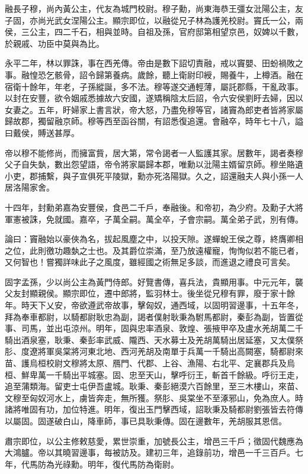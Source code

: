 \begin{pinyinscope}
融長子穆，尚內黃公主，代友為城門校尉。穆子勳，尚東海恭王彊女沘陽公主，友子固，亦尚光武女涅陽公主。顯宗即位，以融從兄子林為護羌校尉。竇氏一公，兩侯，三公主，四二千石，相與並時。自祖及孫，官府邸第相望京邑，奴婢以千數，於親戚、功臣中莫與為比。

永平二年，林以罪誅，事在西羌傳。帝由是數下詔切責融，戒以竇嬰、田蚡禍敗之事。融惶恐乞骸骨，詔令歸第養病。歲餘，聽上衛尉印綬，賜養牛，上樽酒。融在宿衛十餘年，年老，子孫縱誕，多不法。穆等遂交通輕薄，屬託郡縣，干亂政事。以封在安豐，欲令姻戚悉據故六安國，遂矯稱陰太后詔，令六安侯劉盱去婦，因以女妻之。五年，盱婦家上書言狀，帝大怒，乃盡免穆等官，諸竇為郎吏者皆將家屬歸故郡，獨留融京師。穆等西至函谷關，有詔悉復追還。會融卒，時年七十八，謚曰戴侯，賻送甚厚。

帝以穆不能修尚，而擁富貲，居大第，常令謁者一人監護其家。居數年，謁者奏穆父子自失埶，數出怨望語，帝令將家屬歸本郡，唯勳以沘陽主婿留京師。穆坐賂遺小吏，郡捕繫，與子宣俱死平陵獄，勳亦死洛陽獄。久之，詔還融夫人與小孫一人居洛陽家舍。

十四年，封勳弟嘉為安豐侯，食邑二千戶，奉融後。和帝初，為少府。及勳子大將軍憲被誅，免就國。嘉卒，子萬全嗣。萬全卒，子會宗嗣。萬全弟子武，別有傳。

論曰：竇融始以豪俠為名，拔起風塵之中，以投天隙。遂蟬蛻王侯之尊，終膺卿相之位，此則徼功趣埶之士也。及其爵位崇滿，至乃放遠權寵，恂恂似若不能已者，又何智也！嘗獨詳味此子之風度，雖經國之術無足多談，而進退之禮良可言矣。

固字孟孫，少以尚公主為黃門侍郎。好覽書傳，喜兵法，貴顯用事。中元元年，襲父友封顯親侯。顯宗即位，遷中郎將，監羽林士。後坐從兄穆有罪，廢于家十餘年。時天下乂安，帝欲遵武帝故事，擊匈奴，通西域，以固明習邊事，十五年冬，拜為奉車都尉，以騎都尉耿忠為副，謁者僕射耿秉為駙馬都尉，秦彭為副，皆置從事、司馬，並出屯涼州。明年，固與忠率酒泉、敦煌、張掖甲卒及盧水羌胡萬二千騎出酒泉塞，耿秉、秦彭率武威、隴西、天水募士及羌胡萬騎出居延塞，又太僕祭肜、度遼將軍吳棠將河東北地、西河羌胡及南單于兵萬一千騎出高闕塞，騎都尉來苗、護烏桓校尉文穆將太原、鴈門、代郡、上谷、漁陽、右北平、定襄郡兵及烏桓、鮮卑萬一千騎出平城塞。固、忠至天山，擊呼衍王，斬首千餘級。呼衍王走，追至蒲類海。留吏士屯伊吾盧城。耿秉、秦彭絕漠六百餘里，至三木樓山，來苗、文穆至匈奴河水上，虜皆奔走，無所獲。祭肜、吳棠坐不至涿邪山，免為庶人。時諸將唯固有功，加位特進。明年，復出玉門擊西域，詔耿秉及騎都尉劉張皆去符傳以屬固。固遂破白山，降車師，事已具耿秉傳。固在邊數年，羌胡服其恩信。

肅宗即位，以公主修敕慈愛，累世崇重，加號長公主，增邑三千戶；徵固代魏應為大鴻臚。帝以其曉習邊事，每被訪及。建初三年，追錄前功，增邑一千三百戶。七年，代馬防為光祿勳。明年，復代馬防為衛尉。


\end{pinyinscope}
